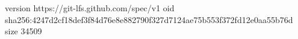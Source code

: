 version https://git-lfs.github.com/spec/v1
oid sha256:4247d2cf18def3f84d76e8e882790f327d7124ae75b553f372fd12e0aa55b76d
size 34509
